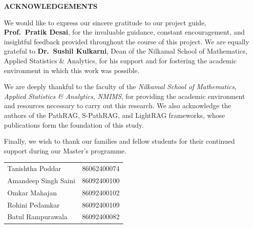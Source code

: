 \documentclass[12pt,a4paper,oneside]{report}
\begin{document}
\begin{titlepage}
    \thispagestyle{empty}
    \vspace*{1cm}
    \begin{center}
        {\LARGE\bfseries ACKNOWLEDGEMENTS}
    \end{center}
    \vspace{1cm}

    \noindent We would like to express our sincere gratitude to our project
    guide, \textbf{Prof.\ Pratik Desai}, for the invaluable guidance,
    constant encouragement, and insightful feedback provided throughout the
    course of this project. We are equally grateful to
    \textbf{Dr.\ Sushil Kulkarni}, Dean of the Nilkamal School of
    Mathematics, Applied Statistics \& Analytics, for his support and for
    fostering the academic environment in which this work was possible.

    We are deeply thankful to the faculty of the \textit{Nilkamal School of
    Mathematics, Applied Statistics \& Analytics, NMIMS}, for providing the
    academic environment and resources necessary to carry out this research.
    We also acknowledge the authors of the PathRAG, S-PathRAG, and LightRAG
    frameworks, whose publications form the foundation of this study.

    Finally, we wish to thank our families and fellow students for their
    continued support during our Master's programme.

    \vfill

    \begin{flushright}
        \begin{tabular}{@{}l l@{}}
            Tanishtha Poddar       & 86062400074 \\
            Amandeep Singh Saini   & 86092400100 \\
            Omkar Mahajan          & 86092400102 \\
            Rohini Pedamkar        & 86092400109 \\
            Batul Rampurawala      & 86092400082 \\
        \end{tabular}
    \end{flushright}
\end{titlepage}

\pagestyle{frontmatter}
\end{document}
